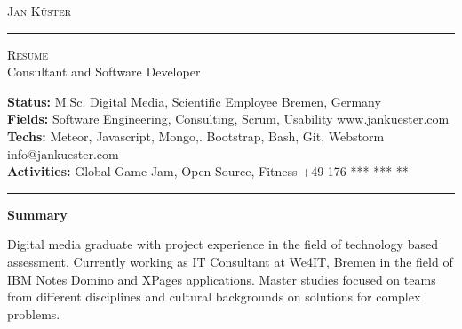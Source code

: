 \documentclass[10pt,A4]{article}
\newcommand{\cvsection}[1]
{
	\begin{center}
		\large\textcolor{sectcol}{\textbf{#1}}
	\end{center}
}
\newcommand{\metasection}[2]
{
\footnotesize{#2} \hspace*{\fill} \footnotesize{#1}\\[1pt]
}
\begin{document}
\pagestyle{fancy}	








\vspace{-8pt}
\begin{center}
	\HUGE \textsc{Jan Küster} \textcolor{sectcol}{\rule[-1mm]{1mm}{0.9cm}} \textsc{Resume}\\[2pt]
	\small Consultant and Software Developer
\end{center}



\vspace{6pt}


\metasection{Bremen, Germany}{\textbf{Status:} M.Sc. Digital Media, Scientific Employee}
\metasection{www.jankuester.com}{\textbf{Fields:} Software Engineering, Consulting, Scrum, Usability} 
\metasection{info@jankuester.com}{\textbf{Techs:} Meteor, Javascript, Mongo,. Bootstrap, Bash, Git, Webstorm}
\metasection{+49 176 *** *** **}{\textbf{Activities:} Global Game Jam, Open Source, Fitness}
\vspace{-2pt}
\textcolor{softcol}{\hrule}
\vspace{6pt}

\normalsize

\vspace{-6pt}
\cvsection{Summary}
Digital media graduate with project experience in the field of technology based assessment. Currently working as IT Consultant at We4IT, Bremen in the field of IBM Notes Domino and XPages applications. Master studies focused on teams from different disciplines and cultural backgrounds on solutions for complex problems.\\
\end{document}
